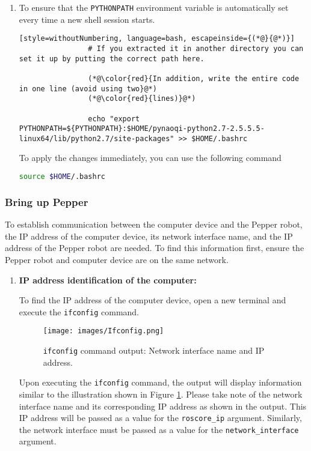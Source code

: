 \documentclass{CSSRforAfrica}
\begin{document}
{{\begin{enumerate}
				\item To ensure that the \texttt{PYTHONPATH} environment variable is automatically set every time a new shell session starts. 
				
				\begin{lstlisting}[style=withoutNumbering, language=bash, escapeinside={(*@}{@*)}]
				# If you extracted it in another directory you can set it up by putting the correct path here. 
				
				(*@\color{red}{In addition, write the entire code in one line (avoid using two}@*)
				(*@\color{red}{lines)}@*)
				
				echo "export PYTHONPATH=${PYTHONPATH}:$HOME/pynaoqi-python2.7-2.5.5.5-linux64/lib/python2.7/site-packages" >> $HOME/.bashrc
				\end{lstlisting}
				
				
				To apply the changes immediately, you can use the following command 
				\begin{lstlisting}[style=withoutNumbering, language=bash]
				source $HOME/.bashrc
				\end{lstlisting}
			\end{enumerate}
		}
		\subsubsection*{Bring up Pepper}
		{
			\label{bup}
			To establish communication between the computer device and the Pepper robot, the IP address of the computer device, its network interface name, and the IP address of the Pepper robot are needed. To find this information first, ensure the Pepper robot and computer device are on the same network.
			
			\begin{enumerate}
				\item \textbf{IP address identification of the computer:}
				{
					\label{ipsystem}
					To find the IP address of the computer device, open a new terminal and execute the \texttt{ifconfig} command.
					
					\begin{figure}[!hbpt]
						\centering
						\texttt{[image: images/Ifconfig.png]}
						\caption{\texttt{ifconfig} command output: Network interface name and IP address.}
						\label{fig:ifconfig}
					\end{figure}
					
					Upon executing the \texttt{ifconfig} command, the output will display information similar to the illustration shown in Figure \ref{fig:ifconfig}. Please take note of the network interface name and its corresponding IP address as shown in the output. This IP address will be passed as a value for the \texttt{roscore\_ip} argument. Similarly, the network interface must be passed as a value for the \texttt{network\_interface} argument.} 
				

\end{enumerate}}}
\end{document}
